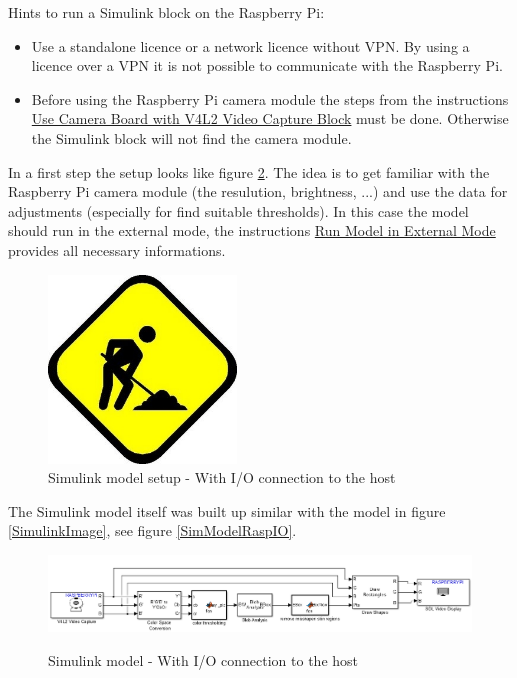 \documentclass[Bachelorarbeit.tex]{subfiles}
\begin{document}
\medskip
Hints to run a Simulink block on the Raspberry Pi:
\begin{itemize}
\item Use a standalone licence or a network licence without VPN. By using a licence over a VPN it is not possible to communicate with the Raspberry Pi.
\item Before using the Raspberry Pi camera module the steps from the instructions \href{https://de.mathworks.com/help/supportpkg/raspberrypi/ug/add-support-for-raspberry-pi-camera-board.html}{Use Camera Board with V4L2 Video Capture Block} must be done. Otherwise the Simulink block will not find the camera module.
\end{itemize}


\medskip
In a first step the setup looks like figure \ref{SimModelWithIO}. The idea is to get familiar with the Raspberry Pi camera module (the resulution, brightness, ...) and use the data for adjustments (especially for find suitable thresholds). In this case the model should run in the external mode, the instructions \href{https://de.mathworks.com/help/supportpkg/rtlsdrradio/ug/run-model-in-external-mode.html}{Run Model in External Mode} provides all necessary informations.

\begin{figure}[!h]
\centering
\includegraphics[width=5cm]{./img/Under_construction.JPG} 
\caption{Simulink model setup - With I/O connection to the host}
\label{SimModelWithIO}
\end{figure}

The Simulink model itself was built up similar with the model in figure \ref{SimulinkImage}, see figure \ref{SimModelRaspIO}.
\begin{figure}[!h]
\centering
\includegraphics[width=14cm]{./img/simulink/Simulink_RaspberryPi.PNG} 
\label{SimModelRaspIO}
\caption{Simulink model - With I/O connection to the host}
\label{SimModelWithIO}
\end{figure}
\end{document}
